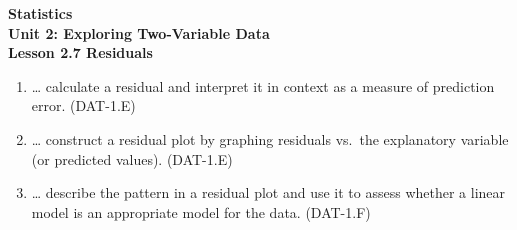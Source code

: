 \documentclass[10pt]{article}
\begin{document}
\vspace{-0.8in}

\begin{center}
  {\color{white}\textbf{\LARGE Statistics}}\\[4pt]
  {\color{skymid}\large\textbf{Unit 2: Exploring Two-Variable Data}}\\[6pt]
  {\color{white}\textbf{\large Lesson 2.7 \quad Residuals}}
\end{center}

\vspace{0.22in}
\namedateperiod
\vspace{0.18in}

\begin{learningtargetbox}
\small
\begin{enumerate}[leftmargin=1.5em, itemsep=5pt]
  \item \ldots{} calculate a residual and interpret it in context as a measure of prediction
        error. \hfill\textcolor{slate}{\small(DAT-1.E)}
  \item \ldots{} construct a residual plot by graphing residuals vs.\ the explanatory variable
        (or predicted values). \hfill\textcolor{slate}{\small(DAT-1.E)}
  \item \ldots{} describe the pattern in a residual plot and use it to assess whether a linear
        model is an appropriate model for the data. \hfill\textcolor{slate}{\small(DAT-1.F)}
\end{enumerate}
\end{learningtargetbox}

\vspace{0.14in}
\end{document}
